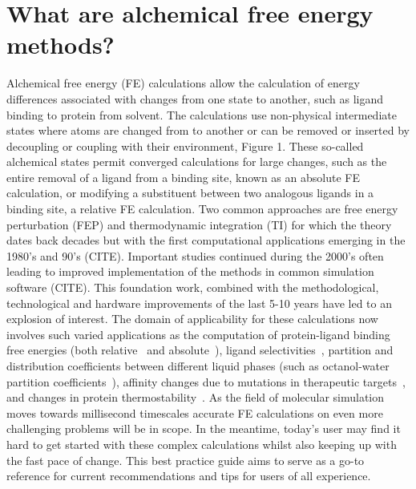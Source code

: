 \documentclass[9pt,bestpractices]{livecoms}
\begin{document}
\section{What are alchemical free energy methods?}
\label{sec:intro}
Alchemical free energy (FE) calculations allow the calculation of energy differences associated with changes from one state to another, such as ligand binding to protein from solvent. The calculations use non-physical intermediate states where atoms are changed from to another or can be removed or inserted by decoupling or coupling with their environment, Figure 1. These so-called alchemical states permit converged calculations for large changes, such as the entire removal of a ligand from a binding site, known as an absolute FE calculation, or modifying a substituent between two analogous ligands in a binding site, a relative FE calculation. Two common approaches are free energy perturbation (FEP) and thermodynamic integration (TI) for which the theory dates back decades but with the first computational applications emerging in the 1980's and 90's (CITE). Important studies continued during the 2000's often leading to improved implementation of the methods in common simulation software (CITE). This foundation work, combined with the methodological, technological and hardware improvements of the last 5-10 years have led to an explosion of interest.  The domain of applicability for these calculations now involves such varied applications as the computation of protein-ligand binding free energies (both relative~\cite{relative-binding-free-energies} and absolute~\cite{absolute-binding-free-energies}), ligand selectivities~\cite{selectivity}, partition and distribution coefficients between different liquid phases (such as octanol-water partition coefficients~\cite{octanol-water-partition}), affinity changes due to mutations in therapeutic targets~\cite{hauser2018predicting,aldeghi2018accurate}, and changes in protein thermostability~\cite{seeliger2010protein,gapsys2016insights,gapsys2016accurate,aldeghi2019accurate}. As the field of molecular simulation moves towards millisecond timescales accurate FE calculations on even more challenging problems will be in scope. In the meantime, today's user may find it hard to get started with these complex calculations whilst also keeping up with the fast pace of change. This best practice guide aims to serve as a go-to reference for current recommendations and tips for users of all experience.  
\end{document}

